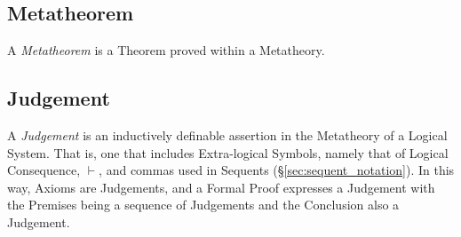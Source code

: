\subsection{Metatheorem}\label{sec:metatheorem}

A \emph{Metatheorem} is a Theorem proved within a Metatheory.



\subsection{Judgement}\label{sec:judgement}

A \emph{Judgement} is an inductively definable assertion in the
Metatheory of a Logical System. That is, one that includes
Extra-logical Symbols, namely that of Logical Consequence, $\vdash$,
and commas used in Sequents (\S\ref{sec:sequent_notation}). In this
way, Axioms are Judgements, and a Formal Proof expresses a Judgement
with the Premises being a sequence of Judgements and the Conclusion
also a Judgement.
